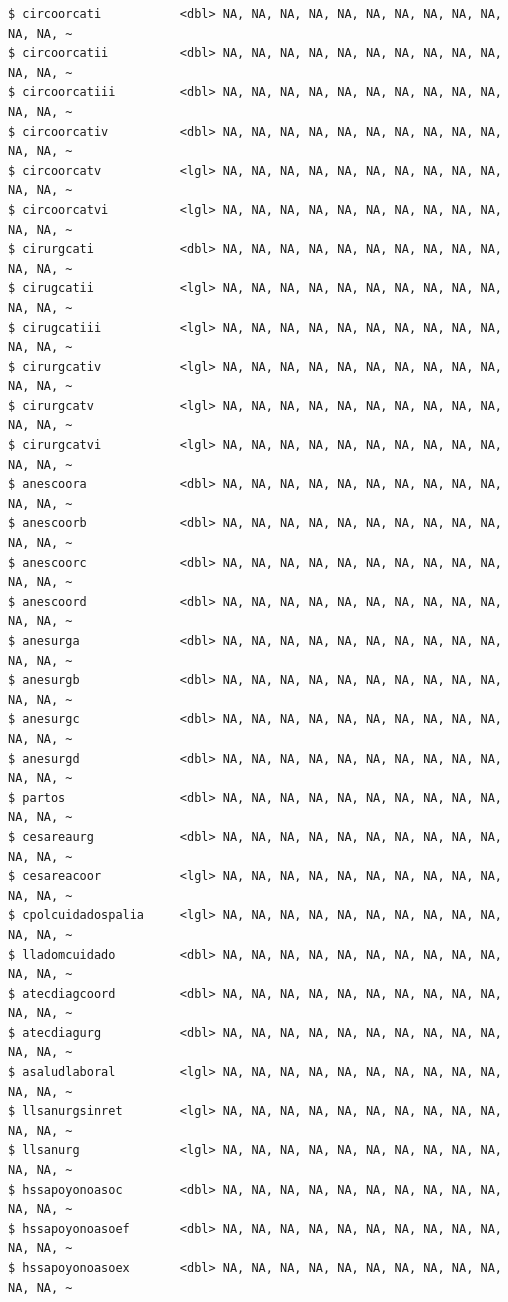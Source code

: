 \documentclass[
  letterpaper,
  DIV=11,
  numbers=noendperiod]{scrreprt}
\begin{document}
\begin{verbatim}
$ circoorcati           <dbl> NA, NA, NA, NA, NA, NA, NA, NA, NA, NA, NA, NA, ~
$ circoorcatii          <dbl> NA, NA, NA, NA, NA, NA, NA, NA, NA, NA, NA, NA, ~
$ circoorcatiii         <dbl> NA, NA, NA, NA, NA, NA, NA, NA, NA, NA, NA, NA, ~
$ circoorcativ          <dbl> NA, NA, NA, NA, NA, NA, NA, NA, NA, NA, NA, NA, ~
$ circoorcatv           <lgl> NA, NA, NA, NA, NA, NA, NA, NA, NA, NA, NA, NA, ~
$ circoorcatvi          <lgl> NA, NA, NA, NA, NA, NA, NA, NA, NA, NA, NA, NA, ~
$ cirurgcati            <dbl> NA, NA, NA, NA, NA, NA, NA, NA, NA, NA, NA, NA, ~
$ cirugcatii            <lgl> NA, NA, NA, NA, NA, NA, NA, NA, NA, NA, NA, NA, ~
$ cirugcatiii           <lgl> NA, NA, NA, NA, NA, NA, NA, NA, NA, NA, NA, NA, ~
$ cirurgcativ           <lgl> NA, NA, NA, NA, NA, NA, NA, NA, NA, NA, NA, NA, ~
$ cirurgcatv            <lgl> NA, NA, NA, NA, NA, NA, NA, NA, NA, NA, NA, NA, ~
$ cirurgcatvi           <lgl> NA, NA, NA, NA, NA, NA, NA, NA, NA, NA, NA, NA, ~
$ anescoora             <dbl> NA, NA, NA, NA, NA, NA, NA, NA, NA, NA, NA, NA, ~
$ anescoorb             <dbl> NA, NA, NA, NA, NA, NA, NA, NA, NA, NA, NA, NA, ~
$ anescoorc             <dbl> NA, NA, NA, NA, NA, NA, NA, NA, NA, NA, NA, NA, ~
$ anescoord             <dbl> NA, NA, NA, NA, NA, NA, NA, NA, NA, NA, NA, NA, ~
$ anesurga              <dbl> NA, NA, NA, NA, NA, NA, NA, NA, NA, NA, NA, NA, ~
$ anesurgb              <dbl> NA, NA, NA, NA, NA, NA, NA, NA, NA, NA, NA, NA, ~
$ anesurgc              <dbl> NA, NA, NA, NA, NA, NA, NA, NA, NA, NA, NA, NA, ~
$ anesurgd              <dbl> NA, NA, NA, NA, NA, NA, NA, NA, NA, NA, NA, NA, ~
$ partos                <dbl> NA, NA, NA, NA, NA, NA, NA, NA, NA, NA, NA, NA, ~
$ cesareaurg            <dbl> NA, NA, NA, NA, NA, NA, NA, NA, NA, NA, NA, NA, ~
$ cesareacoor           <lgl> NA, NA, NA, NA, NA, NA, NA, NA, NA, NA, NA, NA, ~
$ cpolcuidadospalia     <lgl> NA, NA, NA, NA, NA, NA, NA, NA, NA, NA, NA, NA, ~
$ lladomcuidado         <dbl> NA, NA, NA, NA, NA, NA, NA, NA, NA, NA, NA, NA, ~
$ atecdiagcoord         <dbl> NA, NA, NA, NA, NA, NA, NA, NA, NA, NA, NA, NA, ~
$ atecdiagurg           <dbl> NA, NA, NA, NA, NA, NA, NA, NA, NA, NA, NA, NA, ~
$ asaludlaboral         <lgl> NA, NA, NA, NA, NA, NA, NA, NA, NA, NA, NA, NA, ~
$ llsanurgsinret        <lgl> NA, NA, NA, NA, NA, NA, NA, NA, NA, NA, NA, NA, ~
$ llsanurg              <lgl> NA, NA, NA, NA, NA, NA, NA, NA, NA, NA, NA, NA, ~
$ hssapoyonoasoc        <dbl> NA, NA, NA, NA, NA, NA, NA, NA, NA, NA, NA, NA, ~
$ hssapoyonoasoef       <dbl> NA, NA, NA, NA, NA, NA, NA, NA, NA, NA, NA, NA, ~
$ hssapoyonoasoex       <dbl> NA, NA, NA, NA, NA, NA, NA, NA, NA, NA, NA, NA, ~

\end{verbatim}
\end{document}
